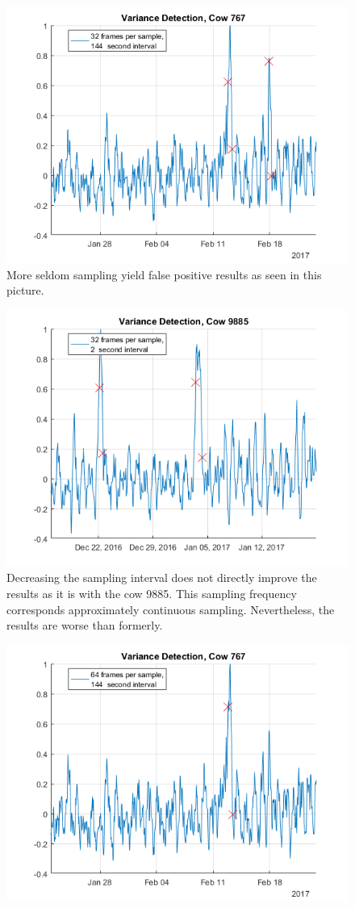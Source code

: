 \begin{figure}[h]
\centering
\includegraphics[width = 0.75 \textwidth]{figures/VarianceDetectionCow767_32frames144seconds.png}
\caption{More seldom sampling yield false positive results as seen in this picture.}
\label{}
\end{figure}


\begin{figure}[h]
\centering
\includegraphics[width = 0.75 \textwidth]{figures/VarianceDetectionCow9885_32frames2seconds.png}
\caption{Decreasing the sampling interval does not directly improve the results as it is with the cow 9885. This sampling frequency corresponds approximately continuous sampling. Nevertheless, the results are worse than formerly.}
\label{}
\end{figure}



\begin{figure}[h]
\centering
\includegraphics[width = 0.75 \textwidth]{figures/VarianceDetectionCow767_64frames144seconds.png}
\caption{}
\label{}
\end{figure}


